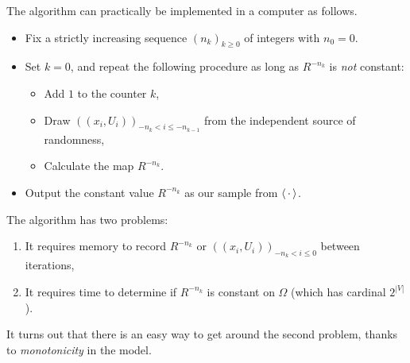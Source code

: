 The algorithm can practically be implemented in a computer as follows.
\begin{itemize}
    \item Fix a strictly increasing sequence $(n_k)_{k\geq 0}$ of integers with $n_0=0$.
    \item Set $k=0$, and repeat the following procedure as long as $R^{-n_k}$ is \emph{not} constant:
    \begin{itemize}
        \item Add $1$ to the counter $k$,
        \item Draw $((x_i,U_i))_{-n_k< i\leq -n_{k-1}}$ from the independent source of randomness,
        \item Calculate the map $R^{-n_k}$.
    \end{itemize}
    \item Output the constant value $R^{-n_k}$ as our sample from $\langle\,\cdot\,\rangle$.
\end{itemize}

The algorithm has two problems:
\begin{enumerate}
    \item It requires memory to record $R^{-n_k}$ or $((x_i,U_i))_{-n_k< i\leq 0}$ between iterations,
    \item It requires time to determine if $R^{-n_k}$ is constant on $\Omega$ (which has cardinal $2^{|V|}$).
\end{enumerate}

It turns out that there is an easy way to get around the second problem,
thanks to \emph{monotonicity} in the model.